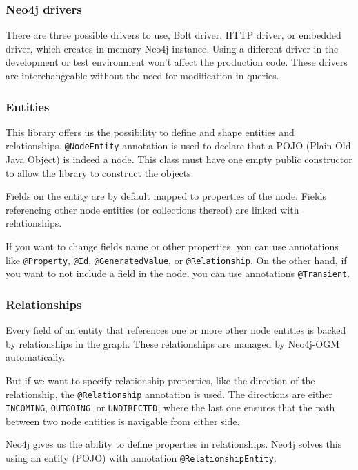 \documentclass[thesis=M,english]{FITthesis}[2019/12/23]
\begin{document}
\subsubsection {Neo4j drivers}

There are three possible drivers to use, Bolt driver, HTTP driver, or embedded driver, which creates in-memory Neo4j instance.
Using a different driver in the development or test environment won't affect the production code. These drivers are interchangeable without the need for modification in queries.

\subsubsection {Entities}

This library offers us the possibility to define and shape entities and relationships. \texttt{@NodeEntity} annotation is used to declare that a POJO (Plain Old Java Object)
is indeed a node. This class must have one empty public constructor to allow the library to construct the objects.

Fields on the entity are by default mapped to properties of the node. Fields referencing other node entities (or collections thereof) are linked with relationships.

If you want to change fields name or other properties, you can use annotations like \texttt{@Property}, \texttt{@Id}, \texttt{@GeneratedValue}, or \texttt{@Relationship}. On the other hand,
if you want to not include a field in the node, you can use annotations \texttt{@Transient}.

\subsubsection {Relationships}

Every field of an entity that references one or more other node entities is backed by relationships in the graph. These relationships are managed by Neo4j-OGM automatically.

But if we want to specify relationship properties, like the direction of the relationship, the \texttt{@Relationship} annotation is used. The directions are either \texttt{INCOMING},
\texttt{OUTGOING}, or \texttt{UNDIRECTED}, where the last one ensures that the path between two node entities is navigable from either side.

Neo4j gives us the ability to define properties in relationships. Neo4j solves this using an entity (POJO) with annotation \texttt{@RelationshipEntity}.
\end{document}
